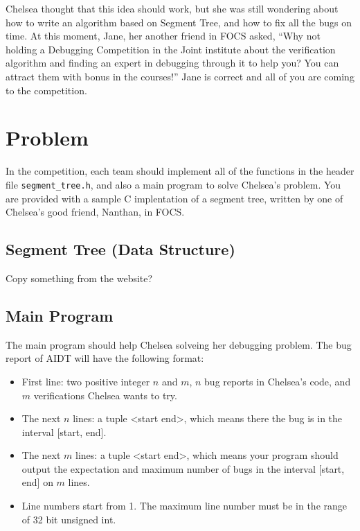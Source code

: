 \documentclass[11pt,a4paper]{article}
\begin{document}
Chelsea thought that this idea should work, but she was still wondering about how to write an algorithm based on Segment Tree, and how to fix all the bugs on time. At this moment, Jane, her another friend in FOCS asked, ``Why not holding a Debugging Competition in the Joint institute about the verification algorithm and  finding an expert in debugging through it to help you? You can attract them with bonus in the courses!'' Jane is correct and all of you are coming to the competition.

\section{Problem}

In the competition, each team should implement all of the functions in the header file \texttt{segment\_tree.h}, and also a main program to solve Chelsea's problem. You are provided with a sample C implentation of a segment tree, written by one of Chelsea's good friend, Nanthan, in FOCS.

\subsection{Segment Tree (Data Structure)}

Copy something from the website?

\subsection{Main Program}

The main program should help Chelsea solveing her debugging problem. The bug report of AIDT will have the following format:

\begin{itemize}
  \item First line: two positive integer $n$ and $m$, $n$ bug reports in Chelsea's code, and $m$ verifications Chelsea wants to try.
  \item The next $n$ lines: a tuple <start end>, which means there the bug is in the interval [start, end].
  \item The next $m$ lines: a tuple <start end>, which means your program should output the expectation and maximum number of bugs in the interval [start, end] on $m$ lines.
  \item Line numbers start from 1. The maximum line number must be in the range of 32 bit unsigned int.
\end{itemize}
\end{document}
